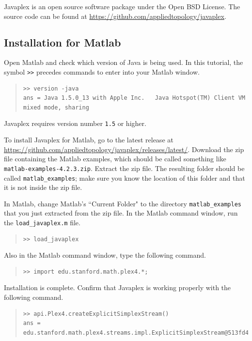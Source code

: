 \documentclass[amscd, amssymb, verbatim]{amsart}[12pt]
\theoremstyle{remark}
\theoremstyle{remark}
\theoremstyle{remark}
\begin{document}
Javaplex is an open source software package under the Open BSD License. The source code can be found at \url{https://github.com/appliedtopology/javaplex}.


\subsection{Installation for Matlab}
Open Matlab and check which version of Java is being used. In this tutorial, the symbol \texttt{>>} precedes commands to enter into your Matlab window.

\begin{quote} \begin{verbatim} 
>> version -java
ans = Java 1.5.0_13 with Apple Inc.   Java Hotspot(TM) Client VM mixed mode, sharing
\end{verbatim} \end{quote}

Javaplex requires version number \texttt{1.5} or higher. 

To install Javaplex for Matlab, go to the latest release at \url{https://github.com/appliedtopology/javaplex/releases/latest/}. Download the zip file containing the Matlab examples, which should be called something like \texttt{matlab-examples-4.2.3.zip}. Extract the zip file. The resulting folder should be called \texttt{matlab\_examples}; make sure you know the location of this folder and that it is not inside the zip file.

In Matlab, change Matlab's ``Current Folder" to the directory \texttt{matlab\_examples} that you just extracted from the zip file. In the Matlab command window, run the \texttt{load\_javaplex.m} file. 

\begin{quote} \begin{verbatim} 
>> load_javaplex
\end{verbatim} \end{quote}

Also in the Matlab command window, type the following command.

\begin{quote} \begin{verbatim} 
>> import edu.stanford.math.plex4.*;
\end{verbatim} \end{quote}

Installation is complete. Confirm that Javaplex is working properly with the following command.

\begin{quote} \begin{verbatim}
>> api.Plex4.createExplicitSimplexStream()
ans = edu.stanford.math.plex4.streams.impl.ExplicitSimplexStream@513fd4
\end{verbatim} \end{quote}
\end{document}
